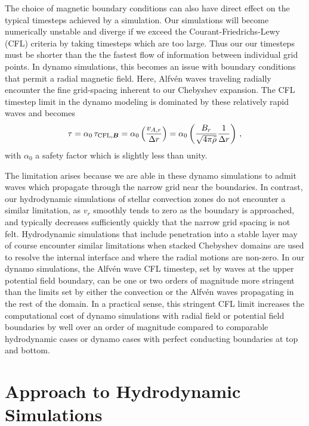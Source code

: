 The choice of magnetic boundary conditions can also have direct effect on
the typical timesteps achieved by a simulation.  Our simulations will
become numerically unstable and diverge if we exceed the
Courant-Friedrichs-Lewy (CFL) criteria by taking timesteps which are
too large.  Thus our our timesteps must be shorter than the 
the fastest flow of information between individual grid points.
In dynamo simulations, this becomes an issue with boundary conditions
that permit a radial magnetic field.  Here, Alfv\'en waves traveling
radially encounter the fine grid-spacing inherent to our
Chebyshev expansion.  The CFL timestep limit in the dynamo modeling is
dominated by these relatively rapid waves and becomes
\begin{equation}
  \tau = \alpha_0 \thinspace \tau_{\mathrm{CFL}, \vec{B}}
       = \alpha_0 \left(\frac{v_{A,r}}{\Delta r}\right) 
       = \alpha_0 \left(\frac{B_r}{\sqrt{4 \pi \bar{\rho}}}\frac{1}{\Delta r}\right)\thinspace,
\end{equation}
with $\alpha_0$ a safety factor which is slightly less than unity.

The limitation arises because we are able in these dynamo
simulations to admit waves which propagate through the narrow grid near
the boundaries.  In contrast, our hydrodynamic simulations of stellar
convection zones do not encounter a similar limitation, as $v_r$
smoothly tends to zero as the boundary is approached, and typically
decreases sufficiently quickly that the narrow grid spacing is not
felt.  Hydrodynamic simulations that include penetration into a stable
layer may of course encounter similar limitations when stacked
Chebyshev domains are used to resolve the internal interface and where
the radial motions are non-zero. In our dynamo simulations,
the Alfv\'en wave CFL timestep, set by waves at the upper potential
field boundary, can be one or two orders of magnitude more stringent
than the limits set by either the convection or the Alfv\'en waves
propagating in the rest of the domain.  In a practical sense, this
stringent CFL limit increases the computational cost of dynamo
simulations with radial field or potential field boundaries by well
over an order of magnitude compared to comparable hydrodynamic cases
or dynamo cases with perfect conducting boundaries at top and bottom.


\section{Approach to Hydrodynamic Simulations}

